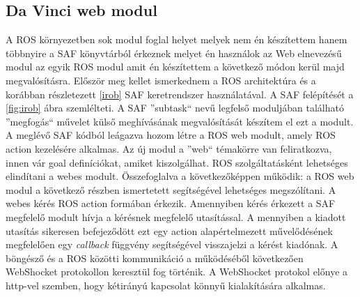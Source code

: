 \documentclass[12pt,a4paper,oneside]{report} %
\begin{document}
\subsection{Da Vinci web modul}
A ROS környezetben sok modul foglal helyet melyek nem én készítettem hanem többnyire a SAF könyvtárból érkeznek melyet én használok az Web elnevezésű modul az egyik ROS modul amit én készítettem a következő módon kerül majd megvalósításra. 
Először meg kellet ismerkednem a ROS architektúra és a korábban részletezett \ref{irob} SAF keretrendszer használatával.
A SAF felépítését a \ref{fig:irob} ábra szemlélteti. A SAF ''subtask`` nevű legfelső moduljában található ''megfogás`` művelet külső meghívásának megvalósítását készítem el ezt a modult. A meglévő SAF kódból leágazva hozom létre a ROS web modult, amely ROS action kezelésére alkalmas. Az új modul a ''web`` témakörre van feliratkozva, innen vár goal definíciókat, amiket kiszolgálhat. ROS szolgáltatásként lehetséges elindítani a webes modult. Összefoglalva a következőképpen működik: a ROS web modul a következő részben ismertetett  segítségével lehetséges megszólítani. A webes kérés ROS action formában érkezik. Amennyiben kérés érkezett a SAF  megfelelő modult hívja a kérésnek megfelelő utasítással. A mennyiben a kiadott utasítás sikeresen befejeződött ezt egy action alapértelmezett művelődésének megfelelően egy \textit{callback} függvény segítségével visszajelzi a kérést kiadónak. A böngésző és a  ROS közötti kommunikáció a  működéséből következően WebShocket protokollon keresztül fog történik. A WebShocket protokol előnye a http-vel szemben, hogy kétirányú kapcsolat könnyű kialakítására alkalmas.
\end{document}
